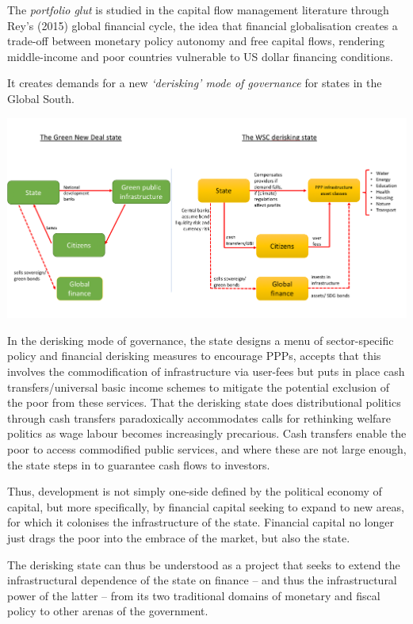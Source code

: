 \documentclass[
]{book}
\begin{document}
The \emph{portfolio glut} is studied in the capital flow management literature
through Rey's (2015) global financial cycle, the idea that
financial globalisation creates a trade-off between monetary policy autonomy and free
capital flows, rendering middle-income and poor countries vulnerable to US dollar
financing conditions.

It creates demands for a new \emph{`derisking' mode of governance} for states in the Global South.

\includegraphics{fig/WSC_State.png}

In the derisking mode of governance, the state designs a menu of sector-specific policy
and financial derisking measures to encourage PPPs, accepts that this involves the
commodification of infrastructure via user-fees but puts in place cash
transfers/universal basic income schemes to mitigate the potential exclusion of the poor
from these services. That the derisking state does distributional politics through cash
transfers paradoxically accommodates calls for rethinking welfare politics as wage
labour becomes increasingly precarious.
Cash transfers enable the poor to access commodified public services,
and where these are not large enough, the state steps in to guarantee cash flows to investors.

Thus, development is not simply one-side defined by the political economy of capital,
but more specifically, by financial capital seeking to expand to new
areas, for which it colonises the infrastructure of the state. Financial capital no longer
just drags the poor into the embrace of the market, but also the state.

The derisking state can thus be understood as a project that seeks to extend the
infrastructural dependence of the state on finance -- and thus the infrastructural power
of the latter -- from its two traditional domains of monetary and fiscal policy to other
arenas of the government.
\end{document}
